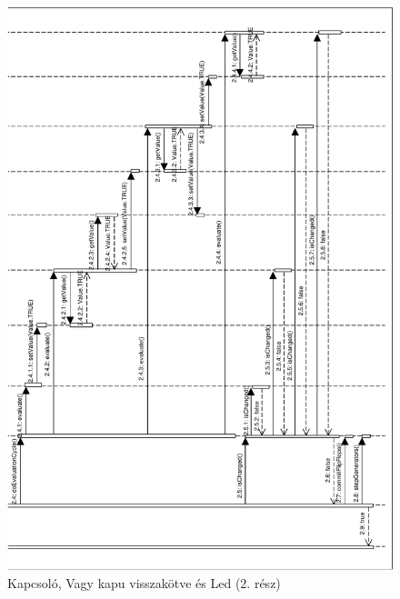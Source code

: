 \begin{figure}[H]
\begin{center}
\includegraphics[width=16cm]{chapters/chapter05/imgs/test5-2.pdf}
\caption{Kapcsoló, Vagy kapu visszakötve és Led (2. rész)}
\label{fig:test5_2}
\end{center}
\end{figure}